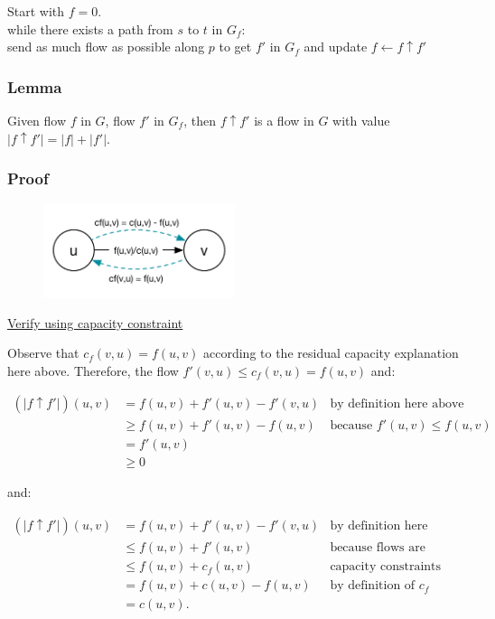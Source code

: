 \documentclass[12pt]{article}
\begin{document}
Start with $f = 0$.\\
while there exists a path from $s$ to $t$ in $G_f$:\\
send as much flow as possible along $p$ to get $f'$ in $G_f$ and update $f \leftarrow f \uparrow f'$

\subsubsection*{\color{blue}Lemma} 

Given flow $f$ in $G$, flow $f'$ in $G_f$, then $f \uparrow f'$ is a flow in $G$ with value $|f \uparrow f'| = |f| + |f'|$.

\subsubsection*{\color{red}Proof}

 \begin{figure}[h!]
  \centering
    \includegraphics[width=0.5\textwidth]{figures/3}
\end{figure}

\underline{Verify using capacity constraint}

Observe that $c_f(v,u) = f(u,v)$ according to the residual capacity explanation here above. Therefore, the flow $f'(v,u) \leq c_f(v,u) = f(u,v)$ and:

\begin{align*}
  (|f \uparrow f'|)(u,v) &=    f(u,v) + f'(u,v) - f'(v,u) & \text{by definition here above}\\
                         &\geq f(u,v) + f'(u,v) - f(u,v)  & \text{because } f'(u,v) \leq f(u,v)\\
                         &=    f'(u,v) \\
                         &\geq 0
\end{align*}

and:

\begin{align*}
  (|f \uparrow f'|)(u,v) &=    f(u,v) + f'(u,v) - f'(v,u) & \text{by definition here above}\\
                         &\leq f(u,v) + f'(u,v)           & \text{because flows are nonnegative}\\
                         &\leq f(u,v) + c_f(u,v)          & \text{capacity constraints}\\
                         &=    f(u,v) + c(u,v) - f(u,v)   & \text{by definition of } c_f\\
                         &=    c(u,v).
\end{align*}
\end{document}
